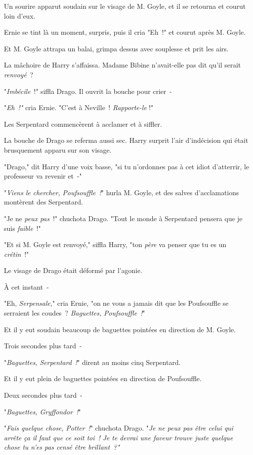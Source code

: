 Un sourire apparut soudain sur le visage de M. Goyle, et il se retourna et courut loin d'eux.

Ernie se tint là un moment, surpris, puis il cria "Eh~!" et courut après M. Goyle.

Et M. Goyle attrapa un balai, grimpa dessus avec souplesse et prit les airs.

La mâchoire de Harry s'affaissa. Madame Bibine n'avait-elle pas dit qu'il serait \emph{renvoyé}~?

"\emph{Imbécile}~!" siffla Drago. Il ouvrit la bouche pour crier~-

"\emph{Eh~!"} cria Ernie. "C'est à Neville~! \emph{Rapporte-le} !"

Les Serpentard commencèrent à acclamer et à siffler.

La bouche de Drago se referma aussi sec. Harry surprit l'air d'indécision qui était brusquement apparu sur son visage.

"Drago," dit Harry d'une voix basse, "si tu n'ordonnes pas à cet idiot d'atterrir, le professeur va revenir et~-"

"\emph{Viens le chercher, Poufsouffle~!}" hurla M. Goyle, et des salves d'acclamations montèrent des Serpentard.

"Je ne \emph{peux pas}~!" chuchota Drago. "Tout le monde à Serpentard pensera que je suis \emph{faible}~!"

"Et si M. Goyle est renvoyé," siffla Harry, "ton \emph{père} va penser que tu es un \emph{crétin}~!"

Le visage de Drago était déformé par l'agonie.

À cet instant~-

"Eh, \emph{Serpensale,}" cria Ernie, "on ne vous a jamais dit que les Poufsouffle se serraient les coudes~? \emph{Baguettes, Poufsouffle~!}"

Et il y eut soudain beaucoup de baguettes pointées en direction de M. Goyle.

Trois secondes plus tard~-

"\emph{Baguettes, Serpentard~!}" dirent au moins cinq Serpentard.

Et il y eut plein de baguettes pointées en direction de Poufsouffle.

Deux secondes plus tard~-

"\emph{Baguettes, Gryffondor~!}"

"\emph{Fais quelque chose, Potter~!}" chuchota Drago. "\emph{Je ne peux pas être celui qui arrête ça il faut que ce soit toi~! Je te devrai une faveur trouve juste quelque chose tu n'es pas censé être brillant~?"}

